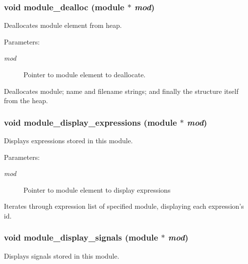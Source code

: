 \subsubsection{\setlength{\rightskip}{0pt plus 5cm}void module\_\-dealloc ({\bf module} $\ast$ {\em mod})}\label{module_8c_a8}


Deallocates module element from heap.

\begin{Desc}
\item[Parameters: ]\par
\begin{description}
\item[{\em 
mod}]Pointer to module element to deallocate.\end{description}
\end{Desc}
Deallocates module; name and filename strings; and finally the structure itself from the heap. 
\subsubsection{\setlength{\rightskip}{0pt plus 5cm}void module\_\-display\_\-expressions ({\bf module} $\ast$ {\em mod})}\label{module_8c_a6}


Displays expressions stored in this module.

\begin{Desc}
\item[Parameters: ]\par
\begin{description}
\item[{\em 
mod}]Pointer to module element to display expressions\end{description}
\end{Desc}
Iterates through expression list of specified module, displaying each expression's id. 
\subsubsection{\setlength{\rightskip}{0pt plus 5cm}void module\_\-display\_\-signals ({\bf module} $\ast$ {\em mod})}\label{module_8c_a5}


Displays signals stored in this module.

